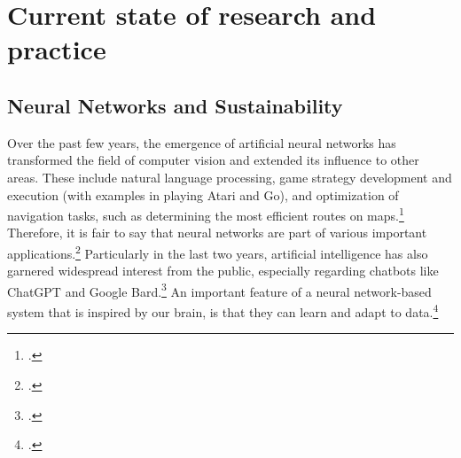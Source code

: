 \chapter{Current state of research and practice}

\section{Neural Networks and Sustainability}

Over the past few years, the emergence of artificial neural networks has transformed
the field of computer vision and extended its influence to other areas. These include natural language processing,
game strategy development and execution (with examples in playing Atari and Go),
and optimization of navigation tasks, such as determining the most efficient routes on maps.\footcite[cf.][305]{cichyDeepNeuralNetworks2019}
Therefore, it is fair to say that neural networks are part of various important applications.\footcite[cf.][1513]{gawlikowskiSurveyUncertaintyDeep2023}
Particularly in the last two years, artificial intelligence has also garnered widespread interest from the public, especially regarding chatbots like ChatGPT and Google Bard.\footcite[cf.][1-2]{singhChatGPTGoogle2023}  
An important feature of a neural network-based system that is inspired by our brain, is that they can learn and adapt to data.\footcite[cf.][305]{cichyDeepNeuralNetworks2019}

